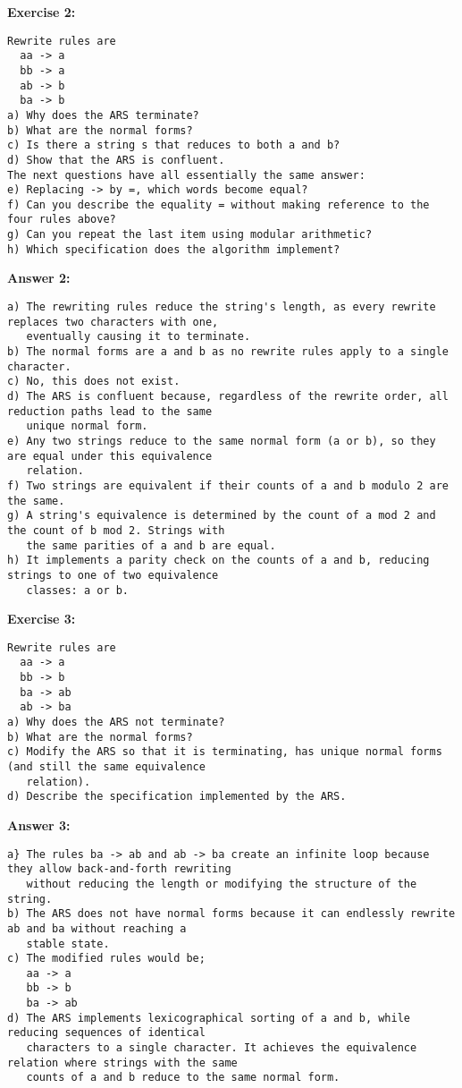 \documentclass{article}
\theoremstyle{theorem}
\theoremstyle{definition}
\theoremstyle{remark}
\begin{document}
\textbf{Exercise 2:}
\begin{verbatim}
Rewrite rules are
  aa -> a
  bb -> a
  ab -> b
  ba -> b 
a) Why does the ARS terminate?
b) What are the normal forms?
c) Is there a string s that reduces to both a and b?
d) Show that the ARS is confluent.
The next questions have all essentially the same answer:
e) Replacing -> by =, which words become equal?
f) Can you describe the equality = without making reference to the four rules above?
g) Can you repeat the last item using modular arithmetic?
h) Which specification does the algorithm implement?
\end{verbatim}

\textbf{Answer 2:}
\begin{verbatim}
a) The rewriting rules reduce the string's length, as every rewrite replaces two characters with one, 
   eventually causing it to terminate.
b) The normal forms are a and b as no rewrite rules apply to a single character.
c) No, this does not exist.
d) The ARS is confluent because, regardless of the rewrite order, all reduction paths lead to the same 
   unique normal form.
e) Any two strings reduce to the same normal form (a or b), so they are equal under this equivalence 
   relation.
f) Two strings are equivalent if their counts of a and b modulo 2 are the same.
g) A string's equivalence is determined by the count of a mod 2 and the count of b mod 2. Strings with 
   the same parities of a and b are equal.
h) It implements a parity check on the counts of a and b, reducing strings to one of two equivalence 
   classes: a or b.
\end{verbatim}

\textbf{Exercise 3:}
\begin{verbatim}
Rewrite rules are
  aa -> a
  bb -> b
  ba -> ab
  ab -> ba
a) Why does the ARS not terminate?
b) What are the normal forms?
c) Modify the ARS so that it is terminating, has unique normal forms (and still the same equivalence 
   relation).
d) Describe the specification implemented by the ARS.
\end{verbatim}

\textbf{Answer 3:}
\begin{verbatim}
a} The rules ba -> ab and ab -> ba create an infinite loop because they allow back-and-forth rewriting
   without reducing the length or modifying the structure of the string.
b) The ARS does not have normal forms because it can endlessly rewrite ab and ba without reaching a 
   stable state.
c) The modified rules would be;
   aa -> a
   bb -> b
   ba -> ab
d) The ARS implements lexicographical sorting of a and b, while reducing sequences of identical 
   characters to a single character. It achieves the equivalence relation where strings with the same 
   counts of a and b reduce to the same normal form.
\end{verbatim}
\end{document}
